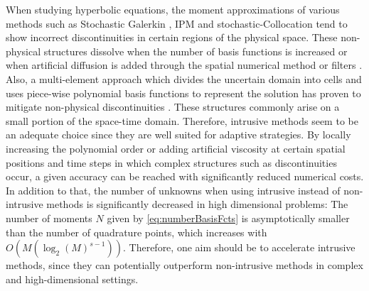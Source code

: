 When studying hyperbolic equations, the moment approximations of various methods such as Stochastic Galerkin \cite{le2004uncertainty}, IPM \cite{kusch2018filtered} and stochastic-Collocation \cite{barth2013non,dwight2013adaptive} tend to show incorrect discontinuities in certain regions of the physical space. These non-physical structures dissolve when the number of basis functions is increased \cite{pettersson2009numerical,offner2017stability} or when artificial diffusion is added through the spatial numerical method \cite{offner2017stability} or filters \cite{kusch2018filtered}. Also, a multi-element approach which divides the uncertain domain into cells and uses piece-wise polynomial basis functions to represent the solution has proven to mitigate non-physical discontinuities \cite{durrwachter2018hyperbolicity}. These structures commonly arise on a small portion of the space-time domain. Therefore, intrusive methods seem to be an adequate choice since they are well suited for adaptive strategies. By locally increasing the polynomial order \cite{tryoen2012adaptive,kroker2012finite,giesselmann2017posteriori} or adding artificial viscosity \cite{kusch2018filtered} at certain spatial positions and time steps in which complex structures such as discontinuities occur, a given accuracy can be reached with significantly reduced numerical costs. In addition to that, the number of unknowns when using intrusive instead of non-intrusive methods is significantly decreased in high dimensional problems: The number of moments $N$ given by \eqref{eq:numberBasisFcts} is asymptotically smaller than the number of quadrature points, which increases with $O(M(\log_2(M)^{s-1}))$. Therefore, one aim should be to accelerate intrusive methods, since they can potentially outperform non-intrusive methods in complex and high-dimensional settings. \\

